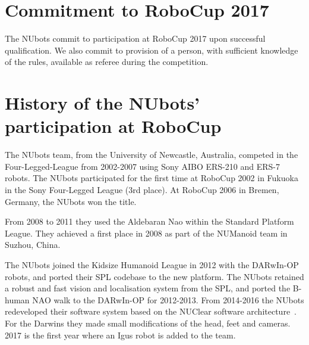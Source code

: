 \documentclass{llncs}
\begin{document}


\section{Commitment to RoboCup 2017}
The NUbots commit to participation at RoboCup 2017 upon successful qualification. We also commit to provision of a person, with sufficient knowledge of the rules, available as referee during the competition.

\section{History of the NUbots' participation at RoboCup}
The NUbots team, from the University of Newcastle, Australia, competed in the Four-Legged-League from 2002-2007 using Sony AIBO ERS-210 and ERS-7 robots. The NUbots participated for the first time at RoboCup 2002 in Fukuoka in the Sony Four-Legged League (3rd place). At RoboCup 2006 in Bremen, Germany, the NUbots won the title. %

From 2008 to 2011 they used the Aldebaran Nao within the Standard Platform League. They achieved a first place in 2008 as part of the NUManoid team in Suzhou, China.

The NUbots joined the Kidsize Humanoid League in 2012 with the DARwIn-OP robots, and ported their SPL codebase to the new platform. The NUbots retained a robust and fast vision and localisation system from the SPL, and ported the B-human NAO walk to the DARwIn-OP for 2012-2013. From 2014-2016 the NUbots redeveloped their software system based on the NUClear software architecture~\cite{HoulistonEtAl2015}. For the Darwins they made small modifications of the head, feet and cameras. 2017 is the first year where an Igus robot is added to the team. 
\end{document}
